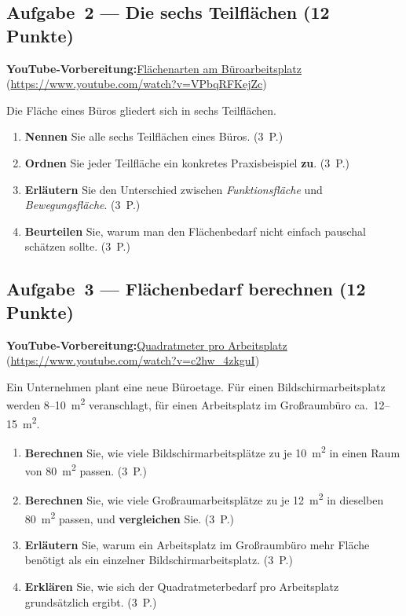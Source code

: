 \documentclass[11pt, a4paper]{article}
\begin{document}
\subsection*{Aufgabe~2 --- Die sechs Teilflächen (12 Punkte)}

\noindent\textbf{\color{bfwAccent}YouTube-Vorbereitung:}\enspace \href{https://www.youtube.com/watch?v=VPbqRFKejZc}{Flächenarten am Büroarbeitsplatz} (\url{https://www.youtube.com/watch?v=VPbqRFKejZc})

\medskip
Die Fläche eines Büros gliedert sich in sechs Teilflächen.

\begin{enumerate}[label=(\alph*)]
  \item \textbf{Nennen} Sie alle sechs Teilflächen eines Büros. \hfill (3~P.)
  \item \textbf{Ordnen} Sie jeder Teilfläche ein konkretes Praxisbeispiel \textbf{zu}. \hfill (3~P.)
  \item \textbf{Erläutern} Sie den Unterschied zwischen \emph{Funktionsfläche} und \emph{Bewegungsfläche}. \hfill (3~P.)
  \item \textbf{Beurteilen} Sie, warum man den Flächenbedarf nicht einfach pauschal schätzen sollte. \hfill (3~P.)
\end{enumerate}

\subsection*{Aufgabe~3 --- Flächenbedarf berechnen (12 Punkte)}

\noindent\textbf{\color{bfwAccent}YouTube-Vorbereitung:}\enspace \href{https://www.youtube.com/watch?v=c2hw_4zkguI}{Quadratmeter pro Arbeitsplatz} (\url{https://www.youtube.com/watch?v=c2hw_4zkguI})

\medskip
Ein Unternehmen plant eine neue Büroetage. Für einen Bildschirm\-arbeitsplatz werden
8--10~m\textsuperscript{2} veranschlagt, für einen Arbeitsplatz im Großraumbüro
ca.\ 12--15~m\textsuperscript{2}.

\begin{enumerate}[label=(\alph*)]
  \item \textbf{Berechnen} Sie, wie viele Bildschirm\-arbeitsplätze zu je 10~m\textsuperscript{2} in einen Raum von 80~m\textsuperscript{2} passen. \hfill (3~P.)
  \item \textbf{Berechnen} Sie, wie viele Großraum\-arbeitsplätze zu je 12~m\textsuperscript{2} in dieselben 80~m\textsuperscript{2} passen, und \textbf{vergleichen} Sie. \hfill (3~P.)
  \item \textbf{Erläutern} Sie, warum ein Arbeitsplatz im Großraumbüro mehr Fläche benötigt als ein einzelner Bildschirm\-arbeitsplatz. \hfill (3~P.)
  \item \textbf{Erklären} Sie, wie sich der Quadratmeter\-bedarf pro Arbeitsplatz grundsätzlich ergibt. \hfill (3~P.)
\end{enumerate}
\end{document}
